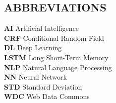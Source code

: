 \documentclass[12pt, a4paper]{report}
\theoremstyle{definition}
\numberwithin{equation}{chapter}
\numberwithin{figure}{chapter}
\numberwithin{table}{chapter}
\begin{document}
\begin{spacing}{1.5}
\vspace*{0.5cm}
\tableofcontents
\end{spacing}

\begin{minipage}{\textwidth}
\begin{spacing}{1.5}
\vspace*{0.5cm}
\listoffigures
\listoftables
\newpage
\end{spacing}
\end{minipage}

\begin{spacing}{2}
\chapter*{ABBREVIATIONS}
\setlength{\parskip}{2.2em}
\setlength{\parindent}{0em}
\textbf{AI} \hspace*{1.35cm} Artificial Intelligence \\
\textbf{CRF} \hspace*{1cm} Conditional Random Field \\
\textbf{DL} \hspace*{1.2cm} Deep Learning \\
\textbf{LSTM} \hspace*{0.8cm} Long Short-Term Memory \\
\textbf{NLP} \hspace*{1cm} Natural Language Processing \\
\textbf{NN} \hspace*{1.2cm} Neural Network \\
\textbf{STD} \hspace*{1cm} Standard Deviation \\
\textbf{WDC} \hspace*{0.85cm} Web Data Commons \\ 

\end{spacing}
\newpage
\end{document}
